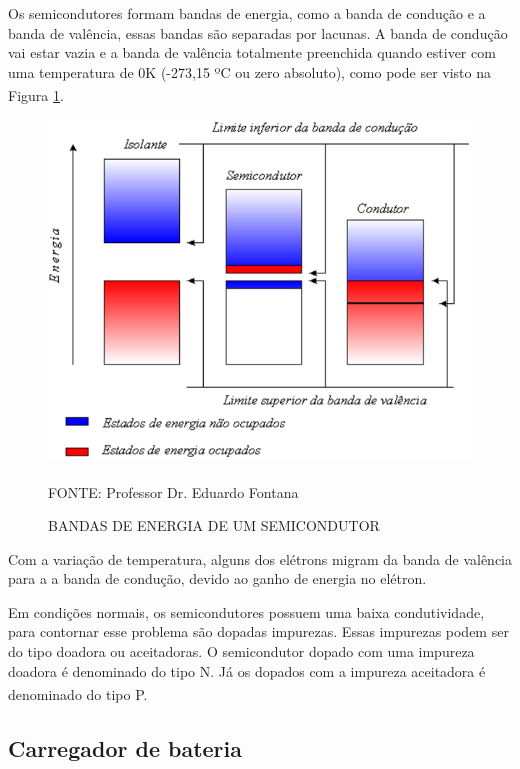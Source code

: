 \documentclass[
	12pt,				%
	openright,			%
	oneside,			%
	a4paper,			%
	english,			%
	french,				%
	spanish,			%
	brazil,				%
	oldfontcommands
	]{abntex2}
\begin{document}
	Os semicondutores formam bandas de energia, como a banda de condução e a banda de valência, essas bandas são separadas por lacunas. A banda de condução vai estar vazia e a banda de valência totalmente preenchida quando estiver com uma temperatura de 0K (-273,15 ºC ou zero absoluto), como pode ser visto na Figura \ref{Fig_bandas}.\textsuperscript{\cite{semicondutores2}}\textsuperscript{\cite{kelvin}}
	
	\begin{figure}[th]
		\caption{BANDAS DE ENERGIA DE UM SEMICONDUTOR}
		\label{Fig_bandas}
		\centering
		\includegraphics[width=0.8\linewidth]{./figs/banda}
			
		\begin{small}
			FONTE: Professor Dr. Eduardo Fontana\textsuperscript{\cite{doutor}}
		\end{small}		
	\end{figure}

	Com a variação de temperatura, alguns dos elétrons migram da banda de valência para a a banda de condução, devido ao ganho de energia no elétron.

	Em condições normais, os semicondutores possuem uma baixa condutividade, para contornar esse problema são dopadas impurezas. Essas impurezas podem ser do tipo doadora ou aceitadoras. O semicondutor dopado com uma impureza doadora é denominado do tipo N. Já os dopados com a impureza aceitadora é denominado do tipo P.\textsuperscript{\cite{semicondutores2}}
	
\subsection[Carregador de bateria]{Carregador de bateria}
\end{document}

